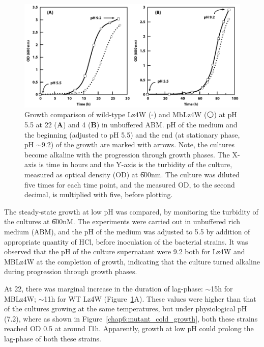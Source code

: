 \begin{figure}[tbp]
\begin{narrow}{-1.5in}{-1.5in}
\centering
\includegraphics{figures/chap6_ph5}
\end{narrow}
\caption[Growth comparison at pH 5.5]{Growth comparison of
wild-type Lz4W ($\square$) and MbLz4W ($\medcirc$) at pH 5.5 at
22\dg{} (\textbf{A}) and 4\dg{} (\textbf{B}) in unbuffered ABM\@.
pH of the medium and the beginning (adjusted to pH 5.5) and the
end (at stationary phase, pH $\sim$9.2) of the growth are marked
with arrows. Note, the cultures become alkaline with the
progression through growth phases. The X-axis is time in hours and
the Y-axis is the turbidity of the culture, measured as optical
density (OD) at \U{600}{nm}. The culture was diluted five times
for each time point, and the measured OD, to the second decimal,
is multiplied with five, before plotting.}
\label{chap6:growth_low_ph}
\end{figure}

The steady-state growth at low pH was compared, by monitoring the
turbidity of the cultures at \U{600}{nM}. The experiments were
carried out in unbuffered rich medium (ABM), and the pH of the
medium was adjusted to 5.5 by addition of appropriate quantity of
HCl, before inoculation of the bacterial strains. It was observed
that the pH of the culture supernatant were 9.2 both for Lz4W and
MBLz4W at the completion of growth, indicating that the culture
turned alkaline during progression through growth phases.

At 22\dg{}, there was marginal increase in the duration of
lag-phase: \U{$\sim$15}{h} for MBLz4W; \U{$\sim$11}{h} for WT Lz4W
(Figure~\ref{chap6:growth_low_ph}A)\@. These values were higher
than that of the cultures growing at the same temperatures, but
under physiological pH (7.2), where as shown in
Figure~\ref{chap6:mutant_cold_growth}, both these strains reached
OD 0.5 at around \U{11}{h}. Apparently, growth at low pH
could prolong the lag-phase of both these strains.

